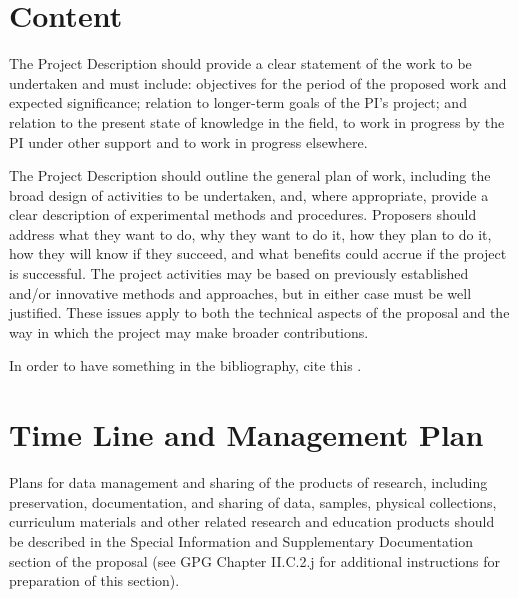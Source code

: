 \section{Content}
The Project Description should provide a clear statement of the work
to be undertaken and must include: objectives for the period of the
proposed work and expected significance; relation to longer-term goals
of the PI's project; and relation to the present state of knowledge in
the field, to work in progress by the PI under other support and to
work in progress elsewhere.

The Project Description should outline the general plan of work,
including the broad design of activities to be undertaken, and, where
appropriate, provide a clear description of experimental methods and
procedures. Proposers should address what they want to do, why they
want to do it, how they plan to do it, how they will know if they
succeed, and what benefits could accrue if the project is
successful. The project activities may be based on previously
established and/or innovative methods and approaches, but in either
case must be well justified. These issues apply to both the technical
aspects of the proposal and the way in which the project may make
broader contributions.

In order to have something in the bibliography, cite this
\citep{Rees1977}.



\section{Time Line and Management Plan}
Plans for data management and sharing of the products of research,
including preservation, documentation, and sharing of data, samples,
physical collections, curriculum materials and other related research
and education products should be described in the Special Information
and Supplementary Documentation section of the proposal (see GPG
Chapter II.C.2.j for additional instructions for preparation of this
section).



